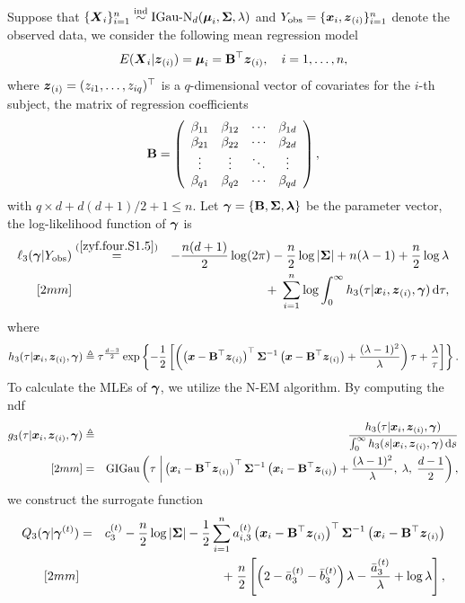 Suppose that $\{{\boldsymbol{X}}_i\}_{i=1}^n \stackrel{{\rm ind}}{\sim} \mbox{IGau-N}_d({\boldsymbol{\mu}}_i, {\mbox{\boldmath$\Sigma$}}, \lambda)$ and $Y_{\rm obs} = \{{\boldsymbol{x}}_i, {\boldsymbol{z}}_{(i)}\}_{i=1}^n$ denote the observed data, we consider the following mean regression model
$$
    E({\boldsymbol{X}}_i | {\boldsymbol{z}}_{(i)}) = {\boldsymbol{\mu}}_i = {\bf B}^\top {\boldsymbol{z}}_{(i)}, \quad i = 1, \dots, n, 
$$
where ${\boldsymbol{z}}_{(i)} = (z_{i1}, \dots, z_{iq})^\top$ is a $q$-dimensional vector of covariates for the $i$-th subject, the matrix of regression coefficients
\begin{eqnarray*}
    {\bf B} = \left(
    \begin{array}{cccc}
        \beta_{11} & \beta_{12} & \cdots & \beta_{1d} \\ 
        \beta_{21} & \beta_{22} & \cdots & \beta_{2d} \\ 
        \vdots   & \vdots   & \ddots & \vdots   \\
        \beta_{q1} & \beta_{q2} & \cdots & \beta_{qd}
    \end{array}
    \right),
\end{eqnarray*}
with $q \times d + d(d + 1) / 2 + 1 \le n$. Let ${\boldsymbol{\gamma}} = \{ {\bf B}, {\mbox{\boldmath$\Sigma$}}, {\boldsymbol{\lambda}}\}$ be the parameter vector, the log-likelihood function of ${\boldsymbol{\gamma}}$ is
\begin{eqnarray*}
    \ell_3({\boldsymbol{\gamma}} | Y_{\rm obs}) &\stackrel{\rm (\ref{zyf.four.S1.5})}{=}& -\frac{n(d + 1)}{2} \log(2\pi) - \frac{n}{2} \log|{\mbox{\boldmath$\Sigma$}}| + n(\lambda - 1) + \frac{n}{2} \log\lambda \\ [2mm]
    && +\; \sum_{i=1}^n \log \int_0^\infty h_3(\tau | {\boldsymbol{x}}_i, {\boldsymbol{z}}_{(i)}, {\boldsymbol{\gamma}}) \,\mbox{d} \tau,
\end{eqnarray*}
where 
$$
    h_3(\tau | {\boldsymbol{x}}_i, {\boldsymbol{z}}_{(i)}, {\boldsymbol{\gamma}}) \triangleq \tau^\frac{d - 3}{2} \exp\left\{-\frac{1}{2}\left[\left(\left({\boldsymbol{x}} - {\bf B}^\top {\boldsymbol{z}}_{(i)}\right)^\top {\mbox{\boldmath$\Sigma$}}^{-1} \left({\boldsymbol{x}} - {\bf B}^\top {\boldsymbol{z}}_{(i)}\right) + \frac{(\lambda - 1)^2}{\lambda} \right) \tau + \frac{\lambda}{\tau} \right]\right\}.
$$
To calculate the MLEs of ${\boldsymbol{\gamma}}$, we utilize the N-EM algorithm. By computing the ndf
\begin{eqnarray*}
    g_3(\tau | {\boldsymbol{x}}_i, {\boldsymbol{z}}_{(i)}, {\boldsymbol{\gamma}}) &\triangleq& \frac{h_3(\tau | {\boldsymbol{x}}_i, {\boldsymbol{z}}_{(i)}, {\boldsymbol{\gamma}})}{\int_0^\infty h_3(s | {\boldsymbol{x}}_i, {\boldsymbol{z}}_{(i)}, {\boldsymbol{\gamma}}) \,\mbox{d} s} \\ [2mm]
    &=& \mbox{GIGau}\left( \tau \;\bigg| \left({\boldsymbol{x}}_i - {\bf B}^\top{\boldsymbol{z}}_{(i)}\right)^\top {\mbox{\boldmath$\Sigma$}}^{-1} \left({\boldsymbol{x}}_i - {\bf B}^\top {\boldsymbol{z}}_{(i)}\right) + \frac{(\lambda - 1)^2}{\lambda},\; \lambda,\; \frac{d - 1}{2}\right),
\end{eqnarray*}
we construct the surrogate function 
\begin{eqnarray*}
    Q_3({\boldsymbol{\gamma}} | {\boldsymbol{\gamma}}^{(t)}) &=& c^{(t)}_{3} - \frac{n}{2} \log|{\mbox{\boldmath$\Sigma$}}| - \frac{1}{2} \sum_{i=1}^n a^{(t)}_{i,3} \left({\boldsymbol{x}}_i - {\bf B}^\top {\boldsymbol{z}}_{(i)} \right)^\top {\mbox{\boldmath$\Sigma$}}^{-1} \left({\boldsymbol{x}}_i - {\bf B}^\top {\boldsymbol{z}}_{(i)} \right) \\ [2mm]
    && +\; \frac{n}{2} \left[ \left(2 - \bar{a}_{3}^{(t)} - \bar{b}_{3}^{(t)}\right) \lambda - \frac{\bar{a}_{3}^{(t)}}{\lambda} + \log\lambda \right],
\end{eqnarray*}
